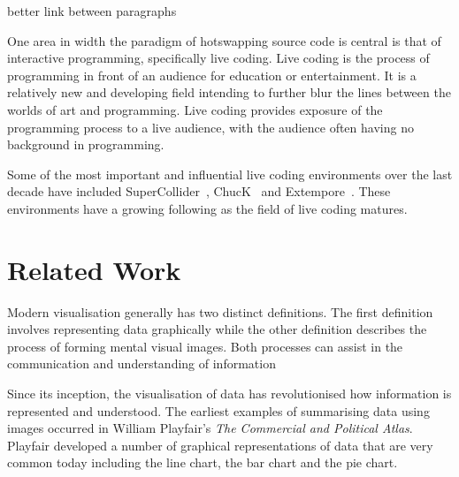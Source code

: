{\color{red} better link between paragraphs}

One area in width the paradigm of hotswapping source code is central is that of interactive programming, specifically live coding. Live coding is the process of programming in front of an audience for education or entertainment. It is a relatively new and developing field intending to further blur the lines between the worlds of art and programming. Live coding provides exposure of the programming process to a live audience, with the audience often having no background in programming.

Some of the most important and influential live coding environments over the last decade have included SuperCollider~\cite{McCartney}, ChucK~\cite{Wang2008} and Extempore~\cite{Sorensen}. These environments have a growing following as the field of live coding matures.


\section{Related Work}



Modern visualisation generally has two distinct definitions. The first definition involves representing data graphically while the other definition describes the process of forming mental visual images. {\color{red} Both processes can assist in the communication and understanding of information}

Since its inception, the visualisation of data has revolutionised how information is represented and understood. The earliest examples of summarising data using images occurred in William Playfair's \textit{The Commercial and Political Atlas}. Playfair developed a number of graphical representations of data that are very common today including the line chart, the bar chart and the pie chart.

